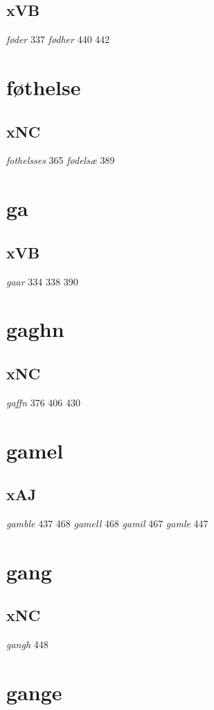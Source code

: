 \documentclass[a4paper,twocolumn]{article}
\begin{document}
\subsection{xVB}
\label{sec:org546249e}
\emph{føder} 337 \emph{fødher} 440 442 
\section{føthelse}
\label{sec:org4772dce}
\subsection{xNC}
\label{sec:org9609faf}
\emph{fothelsses} 365 \emph{fødelsæ} 389 
\section{ga}
\label{sec:org57698d5}
\subsection{xVB}
\label{sec:orga9b02ac}
\emph{gaar} 334 338 390 
\section{gaghn}
\label{sec:orgf5d59e5}
\subsection{xNC}
\label{sec:org75db5ec}
\emph{gaffn} 376 406 430 
\section{gamel}
\label{sec:orgd9983f0}
\subsection{xAJ}
\label{sec:orge7cd74e}
\emph{gamble} 437 468 \emph{gamell} 468 \emph{gamil} 467 \emph{gamle} 447 
\section{gang}
\label{sec:org2b17027}
\subsection{xNC}
\label{sec:org566dd22}
\emph{gangh} 448 
\section{gange}
\label{sec:orgafddb0c}
\end{document}
